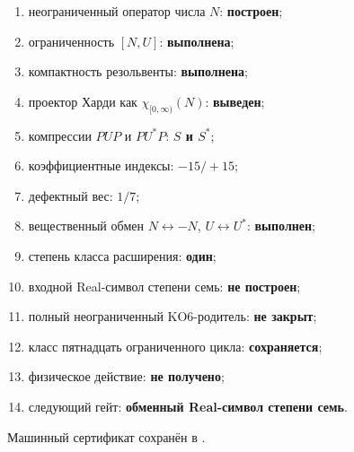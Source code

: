 \begin{protocol}
\begin{enumerate}
 \item неограниченный оператор числа $N$: \textbf{построен};
 \item ограниченность $[N,U]$: \textbf{выполнена};
 \item компактность резольвенты: \textbf{выполнена};
 \item проектор Харди как $\chi_{[0,\infty)}(N)$: \textbf{выведен};
 \item компрессии $PUP$ и $PU^*P$: \textbf{$S$ и $S^*$};
 \item коэффициентные индексы: \textbf{$-15/+15$};
 \item дефектный вес: \textbf{$1/7$};
 \item вещественный обмен $N\leftrightarrow-N$, $U\leftrightarrow U^*$:
 \textbf{выполнен};
 \item степень класса расширения: \textbf{один};
 \item входной Real-символ степени семь: \textbf{не построен};
 \item полный неограниченный KO6-родитель: \textbf{не закрыт};
 \item класс пятнадцать ограниченного цикла: \textbf{сохраняется};
 \item физическое действие: \textbf{не получено};
 \item следующий гейт: \textbf{обменный Real-символ степени семь}.
\end{enumerate}
\end{protocol}

Машинный сертификат сохранён в
.
